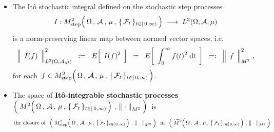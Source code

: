 \begin{remark}
\begin{itemize}
\item
	The It\^{o} stochastic integral defined on the stochastic step processes
	\begin{equation*}
	I : M^{2}_{\textnormal{step}}\!
		\left(\,
			\overset{{\color{white}.}}{\Omega} \,,\, \mathcal{A} \,,\, \mu \,,\, \{\,\mathcal{F}_{t}\,\}_{t \in [\,0,\infty)}
			\,\right)
	\; \longrightarrow \;
	L^{2}(\Omega,\mathcal{A},\mu)
	\end{equation*}
	is a norm-preserving linear map between normed vector spaces, i.e.
	\begin{equation*}
	\left\Vert\;\, \overset{{\color{white}.}}{I(f)} \,\;\right\Vert_{L^{2}(\Omega,\mathcal{A},\mu)}^{2}
	\;\; := \;\;
		E\!\left[\;\, \overset{{\color{white}.}}{I(f)^{2}} \,\;\right]
	\;\; = \;\;
		E\!\left[\;\,
			\int_{0}^{\infty} f(t)^{2} \;\d t
			\,\;\right]
	\;\; =: \;\;
		\left\Vert\;\, \overset{{\color{white}.}}{f} \,\;\right\Vert_{M^{2}}^{2}\,,
	\end{equation*}
	for each
	\,$f \in M^{2}_{\textnormal{step}}\!
		\left(\,
			\overset{{\color{white}.}}{\Omega} \,,\, \mathcal{A} \,,\, \mu \,,\, \{\,\mathcal{F}_{t}\,\}_{t \in [\,0,\infty)}
			\,\right)$.

\item
	The space of \textbf{\color{red}It\^{o}-integrable stochastic processes}
	\,$\left(\;
		M^{2}\!\left(\,
			\overset{{\color{white}.}}{\Omega} \,,\, \mathcal{A} \,,\, \mu \,,\, \{\,\mathcal{F}_{t}\,\}_{t \in [\,0,\infty)}
			\,\right)
		\,,\,
		\left\Vert\;\cdot\;\right\Vert_{M^{2}}
		\;\right)$\,
	is
	\begin{equation*}
	\textnormal{the closure of}\;\;
	\left(\;
		M^{2}_{\textnormal{step}}\!\left(\,
			\overset{{\color{white}.}}{\Omega} \,,\, \mathcal{A} \,,\, \mu \,,\, \{\,\mathcal{F}_{t}\,\}_{t \in [\,0,\infty)}
			\,\right)
		\,,\,
		\left\Vert\;\cdot\;\right\Vert_{M^{2}}
		\;\right)
	\;\;\textnormal{in}\;\;
	\left(\;
		\widetilde{M}^{2}\!\left(\,
			\overset{{\color{white}.}}{\Omega} \,,\, \mathcal{A} \,,\, \mu \,,\, \{\,\mathcal{F}_{t}\,\}_{t \in [\,0,\infty)}
			\,\right)
		\,,\,
		\left\Vert\;\cdot\;\right\Vert_{M^{2}}
		\;\right)
	\end{equation*}


\end{itemize}
\end{remark}
